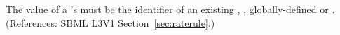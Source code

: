 The value of a \RateRule's  must be the identifier
of an existing \Compartment, \Species, globally-defined \Parameter
or \SpeciesReference.
(References: SBML L3V1 Section~\ref{sec:raterule}.)
